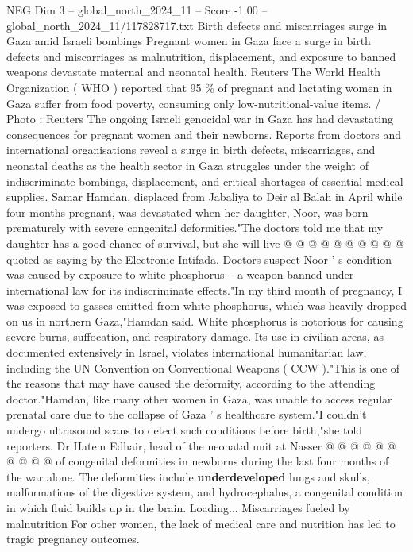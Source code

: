 \begin{textsample}{NEG Dim 3 – global\_north\_2024\_11 – Score -1.00 – global\_north\_2024\_11/117828717.txt}  \label{ex:f3_neg_286}
Birth defects and miscarriages surge in Gaza amid Israeli bombings Pregnant women in Gaza face a surge in birth defects and miscarriages as malnutrition, displacement, and exposure to banned weapons devastate maternal and neonatal health.
Reuters The World Health Organization ( WHO ) reported that 95 \% of pregnant and lactating women in Gaza suffer from food poverty, consuming only low-nutritional-value items. / Photo : Reuters The ongoing Israeli genocidal war in Gaza has had devastating consequences for pregnant women and their newborns.
Reports from doctors and international organisations reveal a surge in birth defects, miscarriages, and neonatal deaths as the health sector in Gaza struggles under the weight of indiscriminate bombings, displacement, and critical shortages of essential medical supplies.
Samar Hamdan, displaced from Jabaliya to Deir al Balah in April while four months pregnant, was devastated when her daughter, Noor, was born prematurely with severe congenital deformities."The doctors told me that my daughter has a good chance of survival, but she will live @ @ @ @ @ @ @ @ @ @ quoted as saying by the Electronic Intifada.
Doctors suspect Noor ' s condition was caused by exposure to white phosphorus -- a weapon banned under international law for its indiscriminate effects."In my third month of pregnancy, I was exposed to gasses emitted from white phosphorus, which was heavily dropped on us in northern Gaza,"Hamdan said.
White phosphorus is notorious for causing severe burns, suffocation, and respiratory damage.
Its use in civilian areas, as documented extensively in Israel, violates international humanitarian law, including the UN Convention on Conventional Weapons ( CCW )."This is one of the reasons that may have caused the deformity, according to the attending doctor."Hamdan, like many other women in Gaza, was unable to access regular prenatal care due to the collapse of Gaza ' s healthcare system."I couldn't undergo ultrasound scans to detect such conditions before birth,"she told reporters.
Dr Hatem Edhair, head of the neonatal unit at Nasser @ @ @ @ @ @ @ @ @ @ of congenital deformities in newborns during the last four months of the war alone.
The deformities include \textbf{underdeveloped} lungs and skulls, malformations of the digestive system, and hydrocephalus, a congenital condition in which fluid builds up in the brain.
Loading...
Miscarriages fueled by malnutrition For other women, the lack of medical care and nutrition has led to tragic pregnancy outcomes.

\end{textsample}
